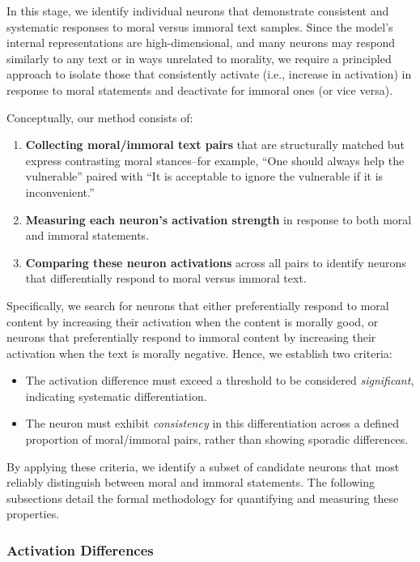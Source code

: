 \documentclass[runninghheads]{llncs}
\newcommand{\qq}[1]{``#1''}  %
\begin{document}
In this stage, we identify individual neurons that demonstrate consistent and systematic responses to moral versus immoral text samples. Since the model's internal representations are high-dimensional, and many neurons may respond similarly to any text or in ways unrelated to morality, we require a principled approach to isolate those that consistently activate (i.e., increase in activation) in response to moral statements and deactivate for immoral ones (or vice versa).

Conceptually, our method consists of:
\begin{enumerate}
   \item \textbf{Collecting moral/immoral text pairs} that are structurally matched but express contrasting moral stances--for example, \qq{One should always help the vulnerable} paired with \qq{It is acceptable to ignore the vulnerable if it is inconvenient.}
   \item \textbf{Measuring each neuron's activation strength} in response to both moral and immoral statements.
   \item \textbf{Comparing these neuron activations} across all pairs to identify neurons that differentially respond to moral versus immoral text.
\end{enumerate}

Specifically, we search for neurons that either preferentially respond to moral content by increasing their activation when the content is morally good, or neurons that preferentially respond to immoral content by increasing their activation when the text is morally negative. Hence, we establish two criteria:

\begin{itemize}
  \item The activation difference must exceed a threshold to be considered \textit{significant}, indicating systematic differentiation.
  \item The neuron must exhibit \emph{consistency} in this differentiation across a defined proportion of moral/immoral pairs, rather than showing sporadic differences.
\end{itemize}

By applying these criteria, we identify a subset of candidate neurons that most reliably distinguish between moral and immoral statements. The following subsections detail the formal methodology for quantifying and measuring these properties.



\subsubsection{Activation Differences}  
\end{document}
